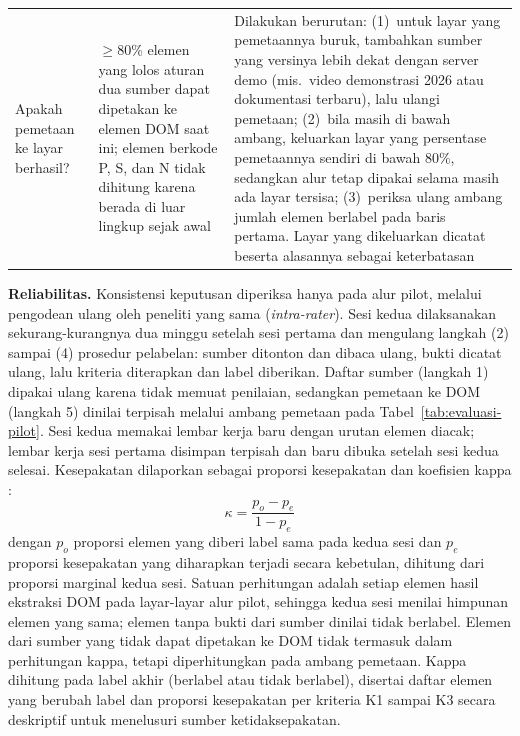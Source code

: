 \begin{longtable}{>{\raggedright\arraybackslash}p{}>{\raggedright\arraybackslash}p{}>{\raggedright\arraybackslash}p{}}
\hline
Apakah pemetaan ke layar berhasil? & $\geq 80\%$ elemen yang lolos aturan dua sumber dapat dipetakan ke elemen DOM saat ini; elemen berkode P, S, dan N tidak dihitung karena berada di luar lingkup sejak awal & Dilakukan berurutan: (1)~untuk layar yang pemetaannya buruk, tambahkan sumber yang versinya lebih dekat dengan server demo (mis.\ video demonstrasi 2026 atau dokumentasi terbaru), lalu ulangi pemetaan; (2)~bila masih di bawah ambang, keluarkan layar yang persentase pemetaannya sendiri di bawah 80\%, sedangkan alur tetap dipakai selama masih ada layar tersisa; (3)~periksa ulang ambang jumlah elemen berlabel pada baris pertama. Layar yang dikeluarkan dicatat beserta alasannya sebagai keterbatasan \\
\end{longtable}

\textbf{Reliabilitas.} Konsistensi keputusan diperiksa hanya pada alur pilot, melalui pengodean ulang oleh peneliti yang sama (\emph{intra-rater}). Sesi kedua dilaksanakan sekurang-kurangnya dua minggu setelah sesi pertama dan mengulang langkah (2) sampai (4) prosedur pelabelan: sumber ditonton dan dibaca ulang, bukti dicatat ulang, lalu kriteria diterapkan dan label diberikan. Daftar sumber (langkah 1) dipakai ulang karena tidak memuat penilaian, sedangkan pemetaan ke DOM (langkah 5) dinilai terpisah melalui ambang pemetaan pada Tabel~\ref{tab:evaluasi-pilot}. Sesi kedua memakai lembar kerja baru dengan urutan elemen diacak; lembar kerja sesi pertama disimpan terpisah dan baru dibuka setelah sesi kedua selesai. Kesepakatan dilaporkan sebagai proporsi kesepakatan dan koefisien kappa \citep{cohen1960coefficient,hallgren2012computing}:
\begin{equation}
  \kappa = \frac{p_o - p_e}{1 - p_e}
  \label{eq:kappa}
\end{equation}
dengan $p_o$ proporsi elemen yang diberi label sama pada kedua sesi dan $p_e$ proporsi kesepakatan yang diharapkan terjadi secara kebetulan, dihitung dari proporsi marginal kedua sesi. Satuan perhitungan adalah setiap elemen hasil ekstraksi DOM pada layar-layar alur pilot, sehingga kedua sesi menilai himpunan elemen yang sama; elemen tanpa bukti dari sumber dinilai tidak berlabel. Elemen dari sumber yang tidak dapat dipetakan ke DOM tidak termasuk dalam perhitungan kappa, tetapi diperhitungkan pada ambang pemetaan. Kappa dihitung pada label akhir (berlabel atau tidak berlabel), disertai daftar elemen yang berubah label dan proporsi kesepakatan per kriteria K1 sampai K3 secara deskriptif untuk menelusuri sumber ketidaksepakatan.

